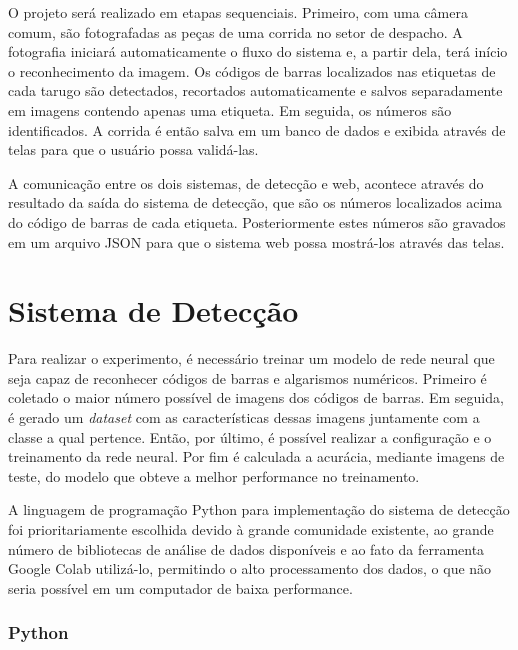 O projeto será realizado em etapas sequenciais. Primeiro, com uma câmera comum, são fotografadas as peças de uma corrida no setor de despacho. A fotografia iniciará automaticamente o fluxo do sistema e, a partir dela, terá início o reconhecimento da imagem. Os códigos de barras localizados nas etiquetas de cada tarugo são detectados, recortados automaticamente e salvos separadamente em imagens contendo apenas uma etiqueta. Em seguida, os números são identificados. A corrida é então salva em um banco de dados e exibida através de telas para que o usuário possa validá-las.

A comunicação entre os dois sistemas, de detecção e web, acontece através do resultado da saída do sistema de detecção, que são os números localizados acima do código de barras de cada etiqueta. Posteriormente estes números são  gravados em um arquivo JSON para que o sistema web possa mostrá-los através das telas. 


\section{Sistema de Detecção} \label{sec:backend}

Para realizar o experimento, é necessário treinar um modelo de rede neural que seja capaz de reconhecer códigos de barras e algarismos numéricos. Primeiro é coletado o maior número possível de imagens dos códigos de barras. Em seguida, é gerado um \textit{dataset} com as características dessas imagens juntamente com a classe a qual pertence. Então, por último, é possível realizar a configuração e o treinamento da rede neural. Por fim é calculada a acurácia, mediante imagens de teste, do modelo que obteve a melhor performance no treinamento.

A linguagem de programação Python para implementação do sistema de detecção foi prioritariamente escolhida devido à grande comunidade existente, ao grande número de bibliotecas de análise de dados disponíveis e ao fato da ferramenta Google Colab utilizá-lo, permitindo o alto processamento dos dados, o que não seria possível em um computador de baixa performance.


\subsubsection{Python}

